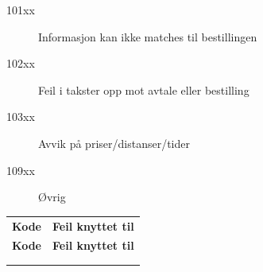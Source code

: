 \documentclass[a4paper,titlepage,norsk,11pt]{article}
\begin{document}
\begin{description}
  \item[101xx] Informasjon kan ikke matches til bestillingen
  \item[102xx] Feil i takster opp mot avtale eller bestilling
  \item[103xx] Avvik på priser/distanser/tider
  \item[109xx] Øvrig
\end{description}


\begin{longtabu}to 
\tabucline{-}
\textbf{Kode} & \textbf{Feil knyttet til} \\
\tabucline{-}
\endfirsthead
\tabucline{-}
\textbf{Kode} & \textbf{Feil knyttet til} \\
\tabucline{-}
\endhead
{} \\
\endfoot
\endlastfoot


\end{longtabu}
\end{document}

